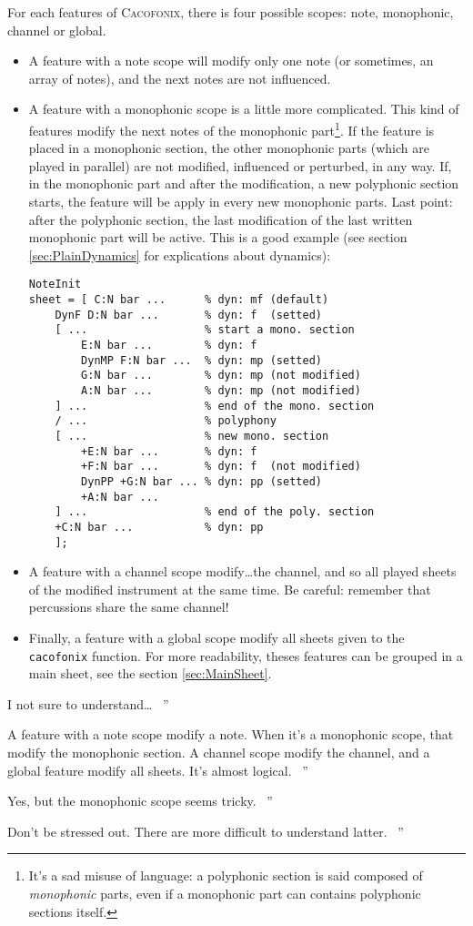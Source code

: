 \documentclass{article}
\newcommand{\cacofonix}{\textsc{Cacofonix}\xspace}
\newenvironment{meenv}{ \par \noindent \makebox[6em][r]{ \textcolor{mecolor}{Me}: `` --~}}{~''}
\newenvironment{myselfenv}{ \par \noindent \makebox[6em][r]{ \textcolor{myselfcolor}{Myself}: `` --~}}{~''}
\newcommand{ \me }[1]{%
\begin{meenv}%
	#1%
\end{meenv} }
\newcommand{ \myself }[1]{%
\begin{myselfenv}%
	#1%
\end{myselfenv} }
\begin{document}
For each features of \cacofonix, there is four possible scopes: note, monophonic, channel or global.
\begin{itemize}
	\item A feature with a note scope will modify only one note (or sometimes, an array of notes), and the next notes are not influenced.
	\item A feature with a monophonic scope is a little more complicated. This kind of features modify the next notes of the monophonic part\footnote{It's a sad misuse of language: a polyphonic section is said composed of \emph{monophonic} parts, even if a monophonic part can contains polyphonic sections itself.}. If the feature is placed in a monophonic section, the other monophonic parts (which are played in parallel) are not modified, influenced or perturbed, in any way. If, in the monophonic part and after the modification, a new polyphonic section starts, the feature will be apply in every new monophonic parts. Last point: after the polyphonic section, the last modification of the last written monophonic part will be active. This is a good example (see section \ref{sec:PlainDynamics} for explications about dynamics):
\begin{lstlisting}
NoteInit
sheet = [ C:N bar ...      % dyn: mf (default)
	DynF D:N bar ...       % dyn: f  (setted)
	[ ...                  % start a mono. section
		E:N bar ...        % dyn: f
		DynMP F:N bar ...  % dyn: mp (setted)
		G:N bar ...        % dyn: mp (not modified)
		A:N bar ...        % dyn: mp (not modified)
	] ...                  % end of the mono. section
	/ ...                  % polyphony
	[ ...                  % new mono. section
		+E:N bar ...       % dyn: f
		+F:N bar ...       % dyn: f  (not modified)
		DynPP +G:N bar ... % dyn: pp (setted)
		+A:N bar ...
	] ...                  % end of the poly. section
	+C:N bar ...           % dyn: pp
	];
\end{lstlisting}
	\item A feature with a channel scope modify\dots the channel, and so all played sheets of the modified instrument at the same time. Be careful: remember that percussions share the same channel!
	\item Finally, a feature with a global scope modify all sheets given to the \lstinline!cacofonix! function. For more readability, theses features can be grouped in a main sheet, see the section \ref{sec:MainSheet}.
\end{itemize}

\me{I not sure to understand\dots}
\myself{A feature with a note scope modify a note. When it's a monophonic scope, that modify the monophonic section. A channel scope modify the channel, and a global feature modify all sheets. It's almost logical.}
\me{Yes, but the monophonic scope seems tricky.}
\myself{Don't be stressed out. There are more difficult to understand latter.}
\end{document}
